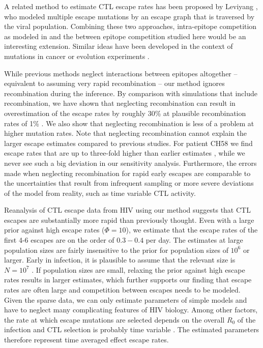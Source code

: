 \documentclass{frontiers}
\newcommand{\fitprior}{\Phi}
\begin{document}
A related method to estimate CTL escape rates has been proposed by
Leviyang \citep{leviyang_computational_2013}, who modeled multiple
escape mutations by an escape graph that is traversed by the viral
population. Combining these two approaches, intra-epitope competition
as modeled in \citep{leviyang_computational_2013} and the between
epitope competition studied here would be an interesting extension.
Similar ideas have been developed in the context of mutations in cancer
or evolution experiments \citep{illingworth_method_2012}.

While previous methods neglect interactions between epitopes altogether
-- equivalent to assuming very rapid recombination -- our method ignores
recombination during the inference. By comparison with simulations that
include recombination, we have shown that neglecting recombination can
result in overestimation of the escape rates by roughly 30\% at plausible
recombination rates of 1\%
\citep{Neher:2010p32691,Batorsky:2011p40107}. We also show that
neglecting recombination is less of a problem at higher mutation rates.
Note that neglecting recombination cannot explain the larger escape
estimates compared to previous studies. For patient CH58 we find escape
rates that are up to three-fold higher than earlier estimates 
\citep{ganusov_fitness_2011}, while we never see such a big deviation in
our sensitivity analysis. Furthermore, the errors made when neglecting
recombination for rapid early escapes are
comparable to the uncertainties that result from infrequent sampling
or more severe deviations of the model from reality, such as
time variable CTL activity. 

Reanalysis of CTL escape data from HIV using our method suggests that
CTL escapes are substantially more rapid than previously thought. Even
with a large prior against high escape rates ($\fitprior=10$), we
estimate that the escape rates of the first 4-6 escapes are on the order
of $0.3-0.4$ per day. The estimates at large population sizes are fairly
insensitive to the prior for population sizes of $10^{6}$ or
larger. Early in infection, it is plausible to assume that the relevant
size is $N=10^7$
\citep{coffin_hiv_1995,perelson_dynamics_1997,boltz_ultrasensitive_2012}.
If population sizes are small, relaxing the prior against high escape
rates results in larger estimates, which further supports our finding
that escape rates are often large and competition between escapes needs
to be modeled. Given the sparse data, we can only estimate parameters of simple models
and have to neglect many complicating features of HIV biology. Among
other factors, the rate at which escape mutations are selected depends
on the overall $R_0$ of the infection and CTL selection is probably time
variable \cite{ganusov_fitness_2011}. The estimated parameters therefore
represent time averaged effect escape rates.
\end{document}
